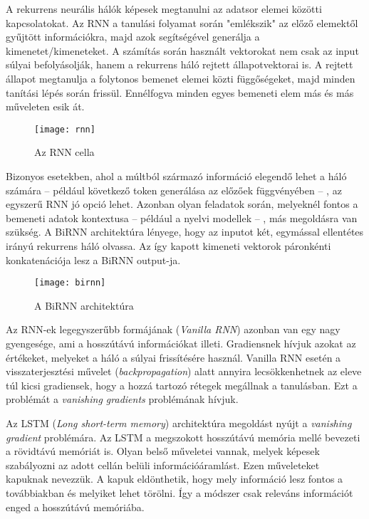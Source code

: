 A rekurrens neurális hálók képesek megtanulni az adatsor elemei közötti kapcsolatokat. Az RNN a tanulási folyamat során "emlékszik" az előző elemektől gyűjtött információkra, majd azok segítségével generálja a kimenetet/kimeneteket. A számítás során használt vektorokat nem csak az input súlyai befolyásolják, hanem a rekurrens háló rejtett állapotvektorai is. A rejtett állapot megtanulja a folytonos bemenet elemei közti függőségeket, majd minden tanítási lépés során frissül. Ennélfogva minden egyes bemeneti elem más és más műveleten esik át.

\begin{figure}[H]
	\centering
	\texttt{[image: rnn]}
	\caption{Az RNN cella \cite{rnn}}
\end{figure}

Bizonyos esetekben, ahol a múltból származó információ elegendő lehet a háló számára – például következő token generálása az előzőek függvényében – , az egyszerű RNN jó opció lehet. Azonban olyan feladatok során, melyeknél fontos a bemeneti adatok kontextusa – például a nyelvi modellek – , más megoldásra van szükség. A BiRNN architektúra lényege, hogy az inputot két, egymással ellentétes irányú rekurrens háló olvassa. Az így kapott kimeneti vektorok páronkénti konkatenációja lesz a BiRNN output-ja.

\begin{figure}[H]
	\centering
	\texttt{[image: birnn]}
	\caption{A BiRNN architektúra \cite{birnn}}
\end{figure}

Az RNN-ek legegyszerűbb formájának (\textit{Vanilla RNN}) azonban van egy nagy gyengesége, ami a hosszútávú információkat illeti. Gradiensnek hívjuk azokat az értékeket, melyeket a háló a súlyai frissítésére használ. Vanilla RNN esetén a visszaterjesztési művelet (\textit{backpropagation}) alatt annyira lecsökkenhetnek az eleve túl kicsi gradiensek, hogy a hozzá tartozó rétegek megállnak a tanulásban. Ezt a problémát a \textit{vanishing gradients} problémának hívjuk.

Az LSTM (\textit{Long short-term memory}) architektúra megoldást nyújt a \textit{vanishing gradient} problémára. Az LSTM a megszokott hosszútávú memória mellé bevezeti a rövidtávú memóriát is. Olyan belső műveletei vannak, melyek képesek szabályozni az adott cellán belüli információáramlást. Ezen műveleteket kapuknak nevezzük. A kapuk eldönthetik, hogy mely információ lesz fontos a továbbiakban és melyiket lehet törölni. Így a módszer csak releváns információt enged a hosszútávú memóriába.


